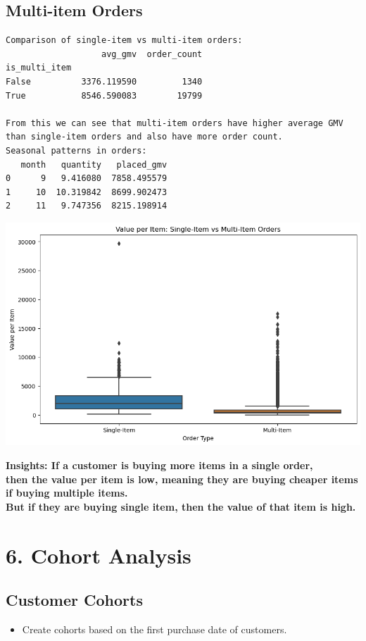 \documentclass{article}
\begin{document}
    \subsection{Multi-item Orders}
    \begin{verbatim}
Comparison of single-item vs multi-item orders:
                   avg_gmv  order_count
is_multi_item                          
False          3376.119590         1340
True           8546.590083        19799

From this we can see that multi-item orders have higher average GMV than single-item orders and also have more order count.
Seasonal patterns in orders:
   month   quantity   placed_gmv
0      9   9.416080  7858.495579
1     10  10.319842  8699.902473
2     11   9.747356  8215.198914
    \end{verbatim}
    \begin{center}
        \includegraphics[width=1\columnwidth]{images/value-per.png}
    \end{center}
    \textbf{Insights: If a customer is buying more items in a single order,\\
     then the value per item is low, meaning they are buying cheaper items if buying multiple items.\\
     But if they are buying single item, then the value of that item is high.}

\section{6. Cohort Analysis}
    \subsection{Customer Cohorts}
    \begin{itemize}
        \item Create cohorts based on the first purchase date of customers.
    \end{itemize}
    
\end{document}
